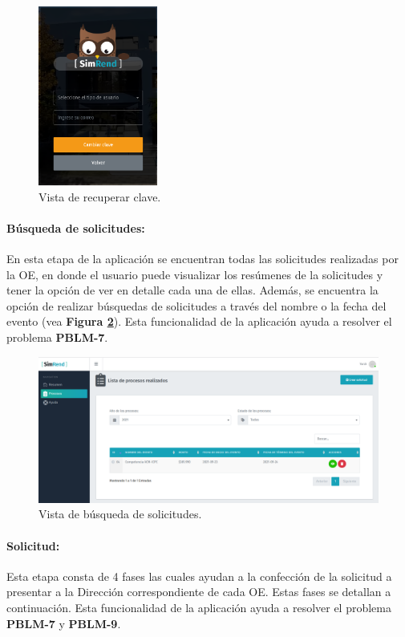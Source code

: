 \begin{figure}[htbp]
    \centering
    \includegraphics[width=0.35\textwidth]{Imagenes/RecuperarClave.PNG}
    \caption{\label{fig: RecuperarClave}Vista de recuperar clave.}
\end{figure}

\paragraph{Búsqueda de solicitudes: } En esta etapa de la aplicación se encuentran todas las solicitudes realizadas por la OE, en donde el usuario puede visualizar los resúmenes de la solicitudes y tener la opción de ver en detalle cada una de ellas. Además, se encuentra la opción de realizar búsquedas de solicitudes a través del nombre o la fecha del evento (vea \textbf{Figura \ref{fig: Busquedas}}). Esta funcionalidad de la aplicación ayuda a resolver el problema \textbf{PBLM-7}.

\begin{figure}[htbp]
    \centering
    \includegraphics[width=1\textwidth]{Imagenes/Busqueda.PNG}
    \caption{\label{fig: Busquedas}Vista de búsqueda de solicitudes.}
\end{figure}

\paragraph{Solicitud: }Esta etapa consta de 4 fases las cuales ayudan a la confección de la solicitud a presentar a la Dirección correspondiente de cada OE. Estas fases se detallan a continuación. Esta funcionalidad de la aplicación ayuda a resolver el problema \textbf{PBLM-7} y \textbf{PBLM-9}.

